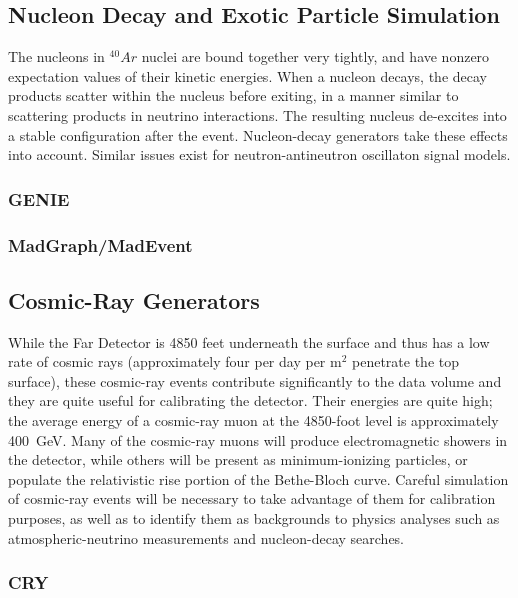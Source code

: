 \subsection{Nucleon Decay and Exotic Particle Simulation}

The nucleons in $^{40}Ar$ nuclei are bound together very tightly, and have nonzero expectation values of their
kinetic energies.  When a nucleon decays, the decay products scatter within the nucleus before exiting, in a manner
similar to scattering products in neutrino interactions.  The resulting nucleus de-excites into a stable configuration
after the event.  Nucleon-decay generators take these effects into account.  Similar issues exist for neutron-antineutron
oscillaton signal models.

 
\subsubsection{GENIE}  %

\subsubsection{MadGraph/MadEvent}

\subsection{Cosmic-Ray Generators}

While the Far Detector is 4850 feet underneath the surface and thus has a low rate of cosmic rays (approximately 
four per day per m$^2$ penetrate the top surface), these cosmic-ray events contribute significantly to the data
volume and they are quite useful for calibrating the detector.  Their energies are quite high; the average energy
of a cosmic-ray muon at the 4850-foot level is approximately 400~GeV.  Many of the cosmic-ray muons will produce
electromagnetic showers in the detector, while others will be present as minimum-ionizing particles, or populate
the relativistic rise portion of the Bethe-Bloch curve.  Careful simulation of cosmic-ray events will be necessary
to take advantage of them for calibration purposes, as well as to identify them as backgrounds to physics analyses
such as atmospheric-neutrino measurements and nucleon-decay searches.

\subsubsection{CRY}

